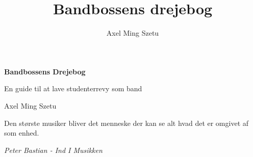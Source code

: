 \documentclass{article}
\title{Bandbossens drejebog}
\date{}
\author{Axel Ming Szetu}
\begin{document}
\begin{titlepage}
    \centering

    \vspace*{2.5cm}

    {\Huge\bfseries Bandbossens Drejebog\par}

    \vspace{0.8cm}

    {\LARGE En guide til at lave studenterrevy som band\par}

    \vspace{2cm}

    {\large Axel Ming Szetu\par}

    \vspace{0.5cm}

\end{titlepage}



\vspace{10cm}

\epigraph{Den største musiker bliver det menneske der kan se alt hvad det er omgivet af som enhed.}{\textit{Peter Bastian - Ind I Musikken}}

\newpage



\tableofcontents














\end{document}
